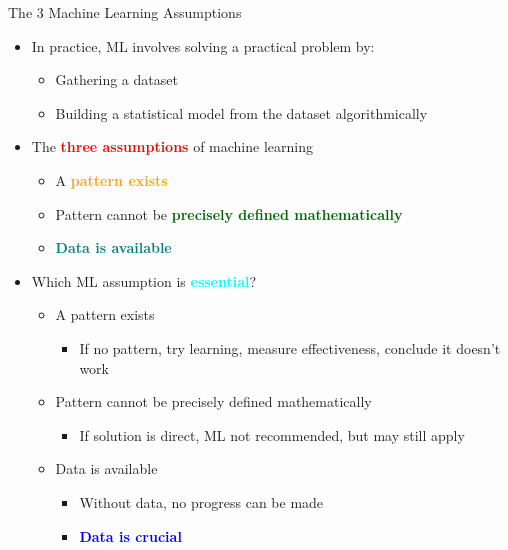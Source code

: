\documentclass[
  10pt,
  ignorenonframetext,
]{beamer}
\providecommand{\tightlist}{%
  \setlength{\itemsep}{0pt}\setlength{\parskip}{0pt}}
\begin{document}
\begin{frame}{The 3 Machine Learning Assumptions}
\label{the-3-machine-learning-assumptions}
\begin{itemize}
\tightlist
\item
  In practice, ML involves solving a practical problem by:

  \begin{itemize}
  \tightlist
  \item
    Gathering a dataset
  \item
    Building a statistical model from the dataset algorithmically
  \end{itemize}
\item
  The \textbf{\textcolor{red}{three assumptions}} of machine learning

  \begin{itemize}
  \tightlist
  \item
    A \textbf{\textcolor{orange}{pattern exists}}
  \item
    Pattern cannot be
    \textbf{\textcolor{darkgreen}{precisely defined mathematically}}
  \item
    \textbf{\textcolor{teal}{Data is available}}
  \end{itemize}
\item
  Which ML assumption is \textbf{\textcolor{cyan}{essential}}?

  \begin{itemize}
  \tightlist
  \item
    A pattern exists

    \begin{itemize}
    \tightlist
    \item
      If no pattern, try learning, measure effectiveness, conclude it
      doesn't work
    \end{itemize}
  \item
    Pattern cannot be precisely defined mathematically

    \begin{itemize}
    \tightlist
    \item
      If solution is direct, ML not recommended, but may still apply
    \end{itemize}
  \item
    Data is available

    \begin{itemize}
    \tightlist
    \item
      Without data, no progress can be made
    \item
      \textbf{\textcolor{blue}{Data is crucial}}
    \end{itemize}
  \end{itemize}
\end{itemize}
\end{frame}
\end{document}
